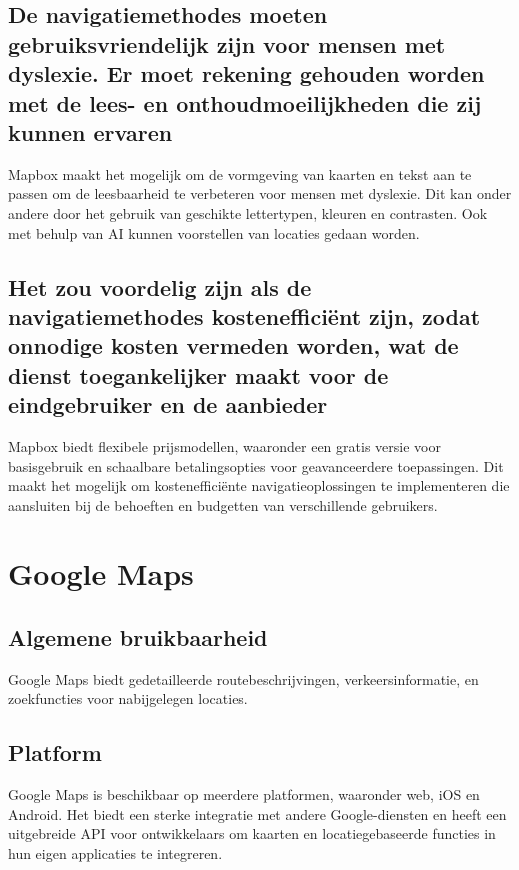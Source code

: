 \subsection*{De navigatiemethodes moeten gebruiksvriendelijk zijn voor mensen met dyslexie. Er moet rekening gehouden worden met de lees- en onthoudmoeilijkheden die zij kunnen ervaren}
Mapbox maakt het mogelijk om de vormgeving van kaarten en tekst aan te passen om de leesbaarheid te verbeteren voor mensen met dyslexie. Dit kan onder andere door het gebruik van geschikte lettertypen, kleuren en contrasten. Ook met behulp van AI kunnen voorstellen van locaties gedaan worden.

\subsection*{Het zou voordelig zijn als de navigatiemethodes kostenefficiënt zijn, zodat onnodige kosten vermeden worden, wat de dienst toegankelijker maakt voor de eindgebruiker en de aanbieder}


Mapbox biedt flexibele prijsmodellen, waaronder een gratis versie voor basisgebruik en schaalbare betalingsopties voor geavanceerdere toepassingen. Dit maakt het mogelijk om kostenefficiënte navigatieoplossingen te implementeren die aansluiten bij de behoeften en budgetten van verschillende gebruikers.

\section{Google Maps}
\label{sec:google maps}


\subsection*{Algemene bruikbaarheid}
Google Maps biedt gedetailleerde routebeschrijvingen, verkeersinformatie, en zoekfuncties voor nabijgelegen locaties.

\subsection*{Platform}
Google Maps is beschikbaar op meerdere platformen, waaronder web, iOS en Android. Het biedt een sterke integratie met andere Google-diensten en heeft een uitgebreide API voor ontwikkelaars om kaarten en locatiegebaseerde functies in hun eigen applicaties te integreren.


